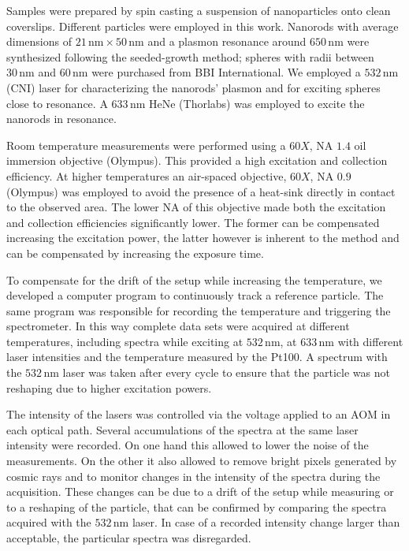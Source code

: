 \documentclass[journal=nalefd,manuscript=letter]{achemso}
\newcommand{\nm}{\ensuremath{\,\textrm{nm}}}
\begin{document}
Samples were prepared by spin casting a suspension of nanoparticles onto clean
coverslips. Different particles were employed in this work. Nanorods with
average dimensions of $21\nm\times50\nm$ and a plasmon resonance around $650\nm$
were synthesized following the seeded-growth method; spheres with radii between
$30\nm$ and $60\nm$ were purchased from BBI International. We employed a
$532\nm$ (CNI) laser for characterizing the nanorods' plasmon and for exciting
spheres close to resonance. A $633\nm$ HeNe (Thorlabs) was employed to excite
the nanorods in resonance.

Room temperature measurements were performed using a $60X$, NA $1.4$ oil
immersion objective (Olympus). This provided a high excitation and collection
efficiency. At higher temperatures an air-spaced objective, $60X$, NA $0.9$
(Olympus) was employed to avoid the presence of a heat-sink directly in contact to the
observed area. The lower NA of this objective made both the excitation and
collection efficiencies significantly lower. The former can be compensated
increasing the excitation power, the latter however is inherent to the method
and can be compensated by increasing the exposure time.

To compensate for the drift of the setup while increasing the temperature, we
developed a computer program to continuously track a reference particle. The
same program was responsible for recording the temperature and triggering the
spectrometer. In this way complete data sets were acquired at different
temperatures, including spectra while exciting at $532\nm$, at $633\nm$ with
different laser intensities and the temperature measured by the Pt100. A
spectrum with the $532\nm$ laser was taken after every cycle to ensure that the
particle was not reshaping due to higher excitation powers.

The intensity of the lasers was controlled via the voltage applied to an AOM in
each optical path. Several accumulations of the spectra at the same laser
intensity were recorded. On one hand this allowed to lower the noise of the
measurements. On the other it also allowed to remove bright pixels generated by
cosmic rays and to monitor changes in the intensity of the spectra during the
acquisition. These changes can be due to a drift of the setup while measuring or
to a reshaping of the particle, that can be confirmed by comparing the spectra
acquired with the $532\nm$ laser. In case of a recorded intensity change larger
than acceptable, the particular spectra was disregarded.
\end{document}

